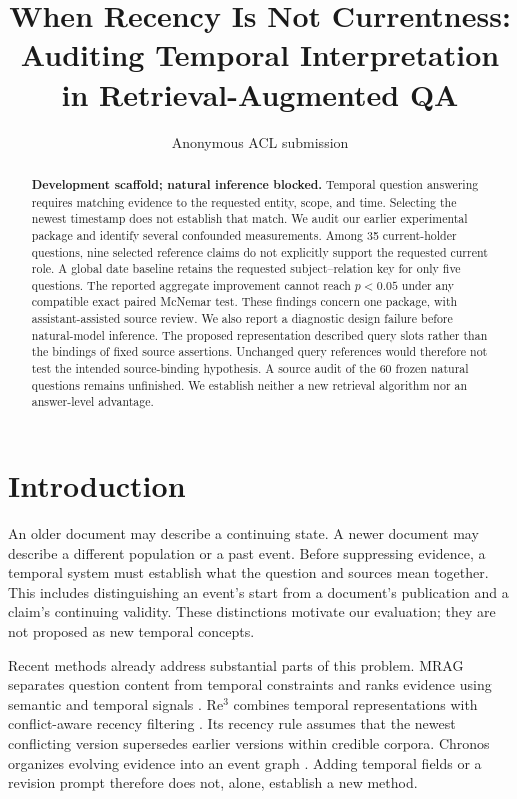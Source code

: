 \documentclass[11pt]{article}
\title{When Recency Is Not Currentness:\\Auditing Temporal Interpretation in Retrieval-Augmented QA}
\author{Anonymous ACL submission}
\begin{document}
\maketitle
\begin{abstract}
\textbf{Development scaffold; natural inference blocked.}
Temporal question answering requires matching evidence to the requested entity, scope, and time.
Selecting the newest timestamp does not establish that match.
We audit our earlier experimental package and identify several confounded measurements.
Among 35 current-holder questions, nine selected reference claims do not explicitly support the requested current role.
A global date baseline retains the requested subject--relation key for only five questions.
The reported aggregate improvement cannot reach $p<0.05$ under any compatible exact paired McNemar test.
These findings concern one package, with assistant-assisted source review.
We also report a diagnostic design failure before natural-model inference.
The proposed representation described query slots rather than the bindings of fixed source assertions.
Unchanged query references would therefore not test the intended source-binding hypothesis.
A source audit of the 60 frozen natural questions remains unfinished.
We establish neither a new retrieval algorithm nor an answer-level advantage.
\end{abstract}

\section{Introduction}

An older document may describe a continuing state.
A newer document may describe a different population or a past event.
Before suppressing evidence, a temporal system must establish what the question and sources mean together.
This includes distinguishing an event's start from a document's publication and a claim's continuing validity.
These distinctions motivate our evaluation; they are not proposed as new temporal concepts.

Recent methods already address substantial parts of this problem.
MRAG separates question content from temporal constraints and ranks evidence using semantic and temporal signals \citep{zhang2025mrag}.
Re$^3$ combines temporal representations with conflict-aware recency filtering \citep{cao2026re3}.
Its recency rule assumes that the newest conflicting version supersedes earlier versions within credible corpora.
Chronos organizes evolving evidence into an event graph \citep{liu2026chronos}.
Adding temporal fields or a revision prompt therefore does not, alone, establish a new method.
\end{document}
